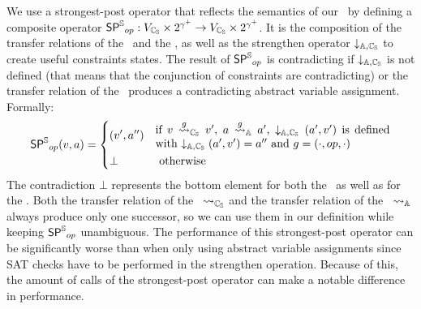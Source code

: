We use a strongest-post operator that reflects the semantics of our \symbolicExecutionCPA\ by 
defining a composite operator $\operatorname{\operatorname{\operatorname{\mathsf{SP}}}^{\mathbb{S}}}_{op} : V_{\mathbb{C_{S}}} \times 2^{\gamma^+} \rightarrow V_{\mathbb{C_{S}}} \times 2^{\gamma^+}$.
It is the composition of the transfer relations of the \symbolicValueAnalysisCPA\ and the \constraintsCPA, as well as the strengthen operator $\downarrow_{{\mathbb{A}}, {\mathbb{C_{S}}}}$ to create useful constraints states.
The result of $\operatorname{\operatorname{\operatorname{\mathsf{SP}}}^{\mathbb{S}}}_{op}$ is contradicting if $\downarrow_{{\mathbb{A}}, {\mathbb{C_{S}}}}$ is not defined (that means that the conjunction of constraints are contradicting) or the transfer relation of the \symbolicValueAnalysisCPA\ produces a contradicting abstract variable assignment.
Formally:
\[ \strongestPostOpSym_{op} (v, a) = \begin{dcases}
(v', a'') & \parbox{.6\textwidth}{ if $v \gtransfer_\symValCPA v'$,  $a \gtransfer_\constrCPA a'$, $\strengthenOp{\constrCPA}{\symValCPA}(a', v')$ is defined with $\strengthenOp{\constrCPA}{\symValCPA}(a', v') = a''$ and $g = (\cdot, op, \cdot)$}\\
\bot & \text{ otherwise}
\end{dcases}\]
The contradiction $\bot$ represents the bottom element for both the \symbolicValueAnalysisCPA\ as well as for the \constraintsCPA.
Both the transfer relation of the \symbolicValueAnalysisCPA\ $\rightsquigarrow_{\mathbb{C_{S}}}$ and the transfer relation of the \constraintsCPA\ $\rightsquigarrow_{\mathbb{A}}$ always produce only one successor, so we can use them in our definition while keeping $\operatorname{\operatorname{\operatorname{\mathsf{SP}}}^{\mathbb{S}}}_{op}$ unambiguous.
The performance of this strongest-post operator can be significantly worse than when only using abstract variable assignments since SAT checks have to be performed in the strengthen operation.
Because of this, the amount of calls of the strongest-post operator can make a notable difference in performance.

